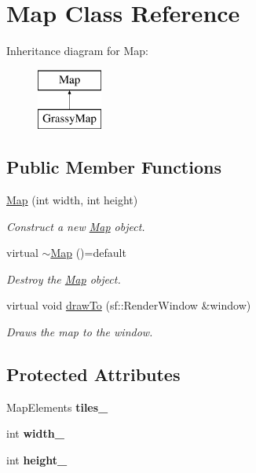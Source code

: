 \hypertarget{classMap}{}\section{Map Class Reference}
\label{classMap}
Inheritance diagram for Map\+:\begin{figure}[H]
\begin{center}
\leavevmode
\includegraphics[height=2.000000cm]{classMap}
\end{center}
\end{figure}
\subsection*{Public Member Functions}
\begin{DoxyCompactItemize}
\item 
\mbox{\hyperlink{classMap_a8497952fd6e1f0584d868e6ceb97d42d}{Map}} (int width, int height)
\begin{DoxyCompactList}\small\item\em Construct a new \mbox{\hyperlink{classMap}{Map}} object. \end{DoxyCompactList}\item 
virtual \mbox{\hyperlink{classMap_a1debdd8c6fec2993906ec9626045c80c}{$\sim$\+Map}} ()=default
\begin{DoxyCompactList}\small\item\em Destroy the \mbox{\hyperlink{classMap}{Map}} object. \end{DoxyCompactList}\item 
virtual void \mbox{\hyperlink{classMap_acbc620429ff8e8de0a62ad322581535f}{draw\+To}} (sf\+::\+Render\+Window \&window)
\begin{DoxyCompactList}\small\item\em Draws the map to the window. \end{DoxyCompactList}\end{DoxyCompactItemize}
\subsection*{Protected Attributes}
\begin{DoxyCompactItemize}
\item 
\mbox{\label{classMap_ab134971f0ca070bcf982391c5de2d913}} 
Map\+Elements {\bfseries tiles\+\_\+}
\item 
\mbox{\label{classMap_a6c90432856cd75ce1e19c4138caf82e7}} 
int {\bfseries width\+\_\+}
\item 
\mbox{\label{classMap_ad8bd63d7d81e3513726c55a1682afc52}} 
int {\bfseries height\+\_\+}
\end{DoxyCompactItemize}


